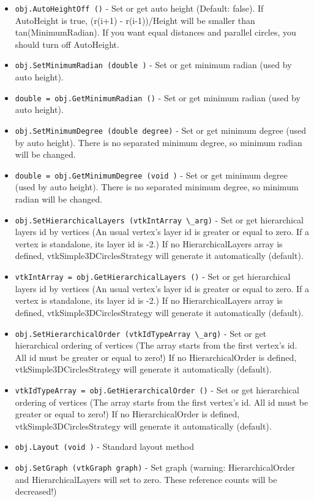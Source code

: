 \begin{itemize}
\item  \verb|obj.AutoHeightOff ()| -  Set or get auto height (Default: false). If AutoHeight is true, (r(i+1) - r(i-1))/Height will be smaller than tan(MinimumRadian).
 If you want equal distances and parallel circles, you should turn off AutoHeight.

\item  \verb|obj.SetMinimumRadian (double )| -  Set or get minimum radian (used by auto height).

\item  \verb|double = obj.GetMinimumRadian ()| -  Set or get minimum radian (used by auto height).

\item  \verb|obj.SetMinimumDegree (double degree)| -  Set or get minimum degree (used by auto height). There is no separated minimum degree, so minimum radian will be changed.

\item  \verb|double = obj.GetMinimumDegree (void )| -  Set or get minimum degree (used by auto height). There is no separated minimum degree, so minimum radian will be changed.

\item  \verb|obj.SetHierarchicalLayers (vtkIntArray \_arg)| -  Set or get hierarchical layers id by vertices (An usual vertex's layer id is greater or equal to zero. If a vertex is standalone, its
 layer id is -2.) If no HierarchicalLayers array is defined, vtkSimple3DCirclesStrategy will generate it automatically (default).

\item  \verb|vtkIntArray = obj.GetHierarchicalLayers ()| -  Set or get hierarchical layers id by vertices (An usual vertex's layer id is greater or equal to zero. If a vertex is standalone, its
 layer id is -2.) If no HierarchicalLayers array is defined, vtkSimple3DCirclesStrategy will generate it automatically (default).

\item  \verb|obj.SetHierarchicalOrder (vtkIdTypeArray \_arg)| -  Set or get hierarchical ordering of vertices (The array starts from the first vertex's id. All id must be greater or equal to zero!)
 If no HierarchicalOrder is defined, vtkSimple3DCirclesStrategy will generate it automatically (default).

\item  \verb|vtkIdTypeArray = obj.GetHierarchicalOrder ()| -  Set or get hierarchical ordering of vertices (The array starts from the first vertex's id. All id must be greater or equal to zero!)
 If no HierarchicalOrder is defined, vtkSimple3DCirclesStrategy will generate it automatically (default).

\item  \verb|obj.Layout (void )| -  Standard layout method

\item  \verb|obj.SetGraph (vtkGraph graph)| -  Set graph (warning: HierarchicalOrder and HierarchicalLayers will set to zero. These reference counts will be decreased!)

\end{itemize}

